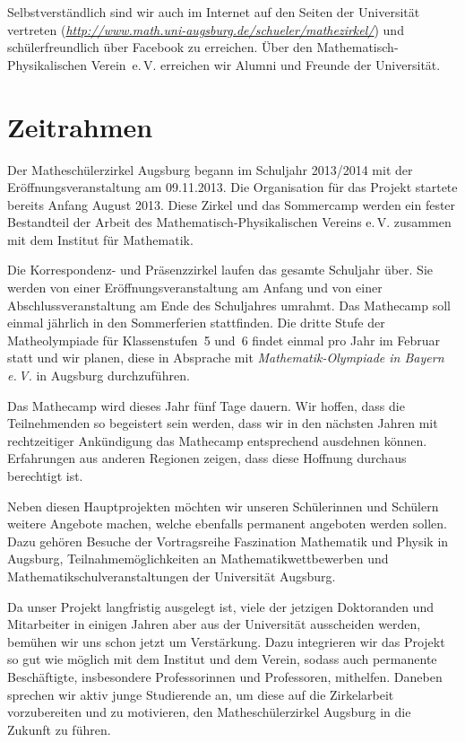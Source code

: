 \documentclass[12pt]{zettel}
\begin{document}
Selbstverständlich sind wir auch im Internet auf den Seiten der Universität
vertreten
(\href{http://www.math.uni-augsburg.de/schueler/mathezirkel/}{\textsl{http:/\!/www.math.uni-augsburg.de/schueler/mathezirkel/}})
und schülerfreundlich über Facebook zu erreichen. Über den
Mathematisch-Physikalischen Verein~e.\,V. erreichen wir Alumni und Freunde der
Universität.


\section{Zeitrahmen}

Der Matheschülerzirkel Augsburg begann im Schuljahr 2013/2014 mit der
Eröff\-nungs\-ver\-an\-stal\-tung am 09.11.2013. Die Organisation für das Projekt
startete bereits Anfang August 2013. Diese Zirkel und
das Sommercamp werden ein fester Bestandteil der Arbeit des
Mathematisch-Physikalischen Vereins e.\,V. zusammen mit dem Institut für
Mathematik.

Die Korrespondenz- und Präsenzzirkel laufen
das gesamte Schuljahr über. Sie werden von einer
Eröffnungsveranstaltung am Anfang und von einer
Abschlussveranstaltung am Ende des Schuljahres umrahmt. Das Mathecamp soll
einmal jährlich in den Sommerferien stattfinden. Die dritte Stufe der
Matheolympiade für Klassenstufen~5 und~6 findet einmal pro Jahr
im Februar statt und wir planen, diese in
Absprache mit \emph{Mathematik-Olympiade in Bayern e.\,V.} in Augsburg
durchzuführen.

Das Mathecamp wird dieses Jahr fünf Tage dauern. Wir hoffen, dass die
Teilnehmenden so begeistert sein werden,
dass wir in den nächsten Jahren mit rechtzeitiger Ankündigung das
Mathecamp entsprechend ausdehnen können. Erfahrungen aus
anderen Regionen zeigen, dass diese Hoffnung durchaus berechtigt ist.

Neben diesen Hauptprojekten möchten wir unseren Schülerinnen und
Schülern weitere Angebote machen, welche ebenfalls permanent angeboten
werden sollen. Dazu gehören Besuche der Vortragsreihe Faszination
Mathematik und Physik in Augsburg, Teilnahmemöglichkeiten
an Mathematikwettbewerben und Mathematikschulveranstaltungen der Universität Augsburg.

Da unser Projekt langfristig ausgelegt ist, viele der jetzigen Doktoranden und
Mitarbeiter in einigen Jahren aber aus der Universität ausscheiden werden,
bemühen wir uns schon jetzt um Verstärkung.
Dazu integrieren wir das Projekt so gut wie möglich mit
dem Institut und dem Verein, sodass auch permanente Beschäftigte,
insbesondere Professorinnen und Professoren, mithelfen. Daneben sprechen wir
aktiv junge Studierende an, um diese auf die Zirkelarbeit
vorzubereiten und zu motivieren, den Matheschülerzirkel
Augsburg in die Zukunft zu führen.
\end{document}
